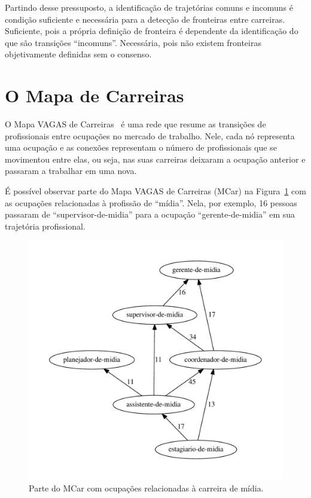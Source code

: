 \documentclass[
  article,
  11pt,
  a4paper,
  english,
  brazil,
  sumario=tradicional]{abntex2}
\begin{document}
Partindo desse pressuposto, a identificação de trajetórias comuns e incomuns é condição suficiente e necessária para a detecção de fronteiras entre carreiras. Suficiente, pois a própria definição de fronteira é dependente da identificação do que são transições \enquote{incomuns}. Necessária, pois não existem fronteiras objetivamente definidas sem o consenso.

\section{O Mapa de Carreiras} \label{sec:mapa}

O Mapa VAGAS de Carreiras~\cite{VAGAS_Tecnologia2015-yv} é uma rede que resume as transições de profissionais entre ocupações no mercado de trabalho. Nele, cada nó representa uma ocupação e as conexões representam o número de profissionais que se movimentou entre elas, ou seja, nas suas carreiras deixaram a ocupação anterior e passaram a trabalhar em uma nova.

É possível observar parte do Mapa VAGAS de Carreiras (MCar) na Figura~\ref{fig:ex-mapa-midia} com as ocupações relacionadas à profissão de \enquote{mídia}. Nela, por exemplo, 16 pessoas passaram de \enquote{supervisor-de-midia} para a ocupação \enquote{gerente-de-midia} em sua trajetória profissional.

\begin{figure}[ht]
  \centering
  \includegraphics[scale=0.6]{cluster_23.pdf}
  \caption{Parte do MCar com ocupações relacionadas à carreira de mídia.}
  \label{fig:ex-mapa-midia}
\end{figure}
\end{document}
